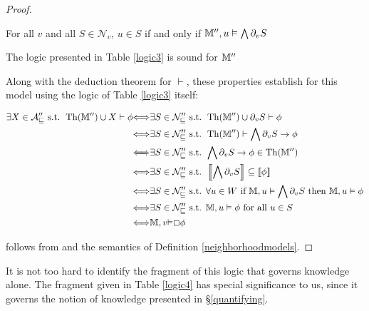 \begin{proof}
\begin{enumerateroman}
    \item For all $v$ and all $S \in \mathcal{N}_v$, $u \in S$ if and only if
    $\mathbbm{M}'', u \vDash \bigwedge \partial_v S$
    
    \item The logic presented in Table \ref{logic3} is sound for
    $\mathbbm{M}''$
  \end{enumerateroman}
  Along with the deduction theorem for $\vdash$, these properties establish
   for this model using the logic of Table \ref{logic3} itself:
  
  \begin{align*}
    \text{$\exists X \in \mathcal{A''_v} \text{ s.t. } \tmop{Th}
    (\mathbbm{M}'') \cup X \vdash \phi$} & {\Longleftrightarrow}\text{$\exists
    S \in \mathcal{N''_v} \text{ s.t. } \tmop{Th} (\mathbbm{M}'') \cup
    \partial_v S \vdash \phi$}\\
    & {\Longleftrightarrow}\text{$\exists S \in \mathcal{N''_v} \text{ s.t. }
    \tmop{Th} (\mathbbm{M}'') \vdash \bigwedge \partial_v S \rightarrow
    \phi$}\\
    & {\Longleftrightarrow}\text{$\exists S \in \mathcal{N''_v} \text{ s.t. }
    \bigwedge \partial_v S \rightarrow \phi \in \tmop{Th} (\mathbbm{M}'')$}\\
    & {\Longleftrightarrow}\text{$\exists S \in \mathcal{N''_v} \text{ s.t. }
    \left\llbracket \bigwedge \partial_v S \right\rrbracket \subseteq
    \left\llbracket \phi \right\rrbracket$}\\
    & {\Longleftrightarrow}\text{$\exists S \in \mathcal{N''_v} \text{ s.t.
    $\forall u \in W$ if } \mathbbm{M}, u \vDash \bigwedge \partial_v S \text{
    then } \mathbbm{M}, u \vDash \phi$}\\
    & {\Longleftrightarrow}\text{$\exists S \in \mathcal{N''_v} \text{ s.t. }
    \mathbbm{M}, u \vDash \phi \text{ for all } u \in S$}\\
    & {\Longleftrightarrow}{\mathbbm{M}},v{\vDash}\Box{\phi}
  \end{align*}
  
   follows from  and the semantics of Definition
  \ref{neighborhoodmodels}.
\end{proof}

It is not too hard to identify the fragment of this logic that governs
knowledge alone.  The fragment given in Table \ref{logic4} has special
significance to us, since it governs the notion of knowledge presented in
{\S}\ref{quantifying}.

